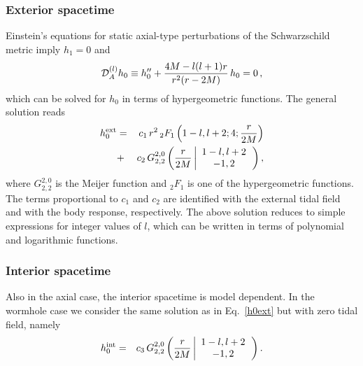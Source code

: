 \documentclass[aps,twocolumn,showpacs,preprintnumbers,nofootinbib,prd,superscriptaddress,groupedaddress,10pt]{revtex4-1}
\def\nn{\nonumber}
\begin{document}
\subsubsection{Exterior spacetime}
Einstein's equations for static axial-type perturbations of the Schwarzschild metric imply $h_1=0$ and 
%
\begin{equation}
{\cal D}_A^{(l)}h_0 \equiv
h_0''+\frac{4 M-l (l+1) r}{r^2 (r-2 M)}\,h_0=0\,,
\end{equation}
%
which can be solved for $h_0$ in terms of hypergeometric functions. The general solution reads~\cite{Binnington:2009bb}
%
\begin{eqnarray}
h_0^{\rm ext} &=& c_1\,r^2 \, {}_2F_1\left(1-l,l+2;4;\frac{r}{2 M}\right)\nn\\
&+&c_2\,G_{2,2}^{2,0}\left(\frac{r}{2 M}\left|
\begin{array}{c}
 1-l,l+2 \\
 -1,2 \\
\end{array}\right.\right),\label{h0ext}
%
\end{eqnarray}
%
where $G_{2,2}^{2,0}$ is the Meijer function and ${}_2F_1$ is one of the hypergeometric functions. The terms proportional to $c_1$ and $c_2$ are identified with the external tidal field and with the body response, respectively. The above solution reduces to simple expressions for integer values of $l$, which can be written in terms of polynomial and logarithmic functions.


\subsubsection{Interior spacetime}

Also in the axial case, the interior spacetime is model dependent. In the wormhole case we consider the same solution as in Eq.~\eqref{h0ext} but with zero tidal field, namely
\begin{eqnarray}
h_0^{\rm int} &=& c_3\,G_{2,2}^{2,0}\left(\frac{r}{2 M}\left|
\begin{array}{c}
 1-l,l+2 \\
 -1,2 \\
\end{array}\right.\right). \label{h0intWH}
\end{eqnarray}
\end{document}
